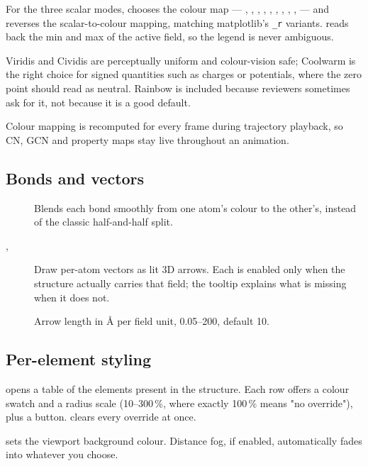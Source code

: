 For the three scalar modes,  chooses the colour map ---
, , , , ,
, , , ,  --- and
 reverses the scalar-to-colour mapping, matching
matplotlib's \texttt{\_r} variants.  reads back the min and max
of the active field, so the legend is never ambiguous.

\begin{caltip}
Viridis and Cividis are perceptually uniform and colour-vision safe;
Coolwarm is the right choice for signed quantities such as charges or
potentials, where the zero point should read as neutral. Rainbow is
included because reviewers sometimes ask for it, not because it is a good
default.
\end{caltip}

Colour mapping is recomputed for every frame during trajectory playback, so
CN, GCN and property maps stay live throughout an animation.

\subsection{Bonds and vectors}

\begin{description}
  \item[] Blends each bond smoothly from one
    atom's colour to the other's, instead of the classic half-and-half
    split.
  \item[, ] Draw per-atom vectors as
    lit 3D arrows. Each is enabled only when the structure actually carries
    that field; the tooltip explains what is missing when it does not.
  \item[] Arrow length in \AA{} per field unit,
    0.05--200, default 10.
\end{description}

\subsection{Per-element styling}

 opens a table of the elements present in the
structure. Each row offers a colour swatch and a radius scale
(10--300\,\%, where exactly 100\,\% means "no override"), plus a
 button.  clears every override at once.

 sets the viewport background colour. Distance fog, if
enabled, automatically fades into whatever you choose.

